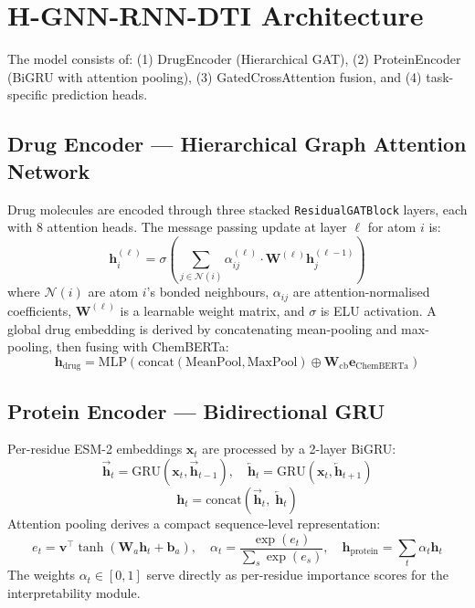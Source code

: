 \documentclass[12pt,a4paper,oneside]{report}
\begin{document}
\section{H-GNN-RNN-DTI Architecture}

The model consists of: (1) DrugEncoder (Hierarchical GAT), (2) ProteinEncoder (BiGRU with attention pooling), (3) GatedCrossAttention fusion, and (4) task-specific prediction heads.

\subsection{Drug Encoder — Hierarchical Graph Attention Network}

Drug molecules are encoded through three stacked \texttt{ResidualGATBlock} layers, each with 8 attention heads. The message passing update at layer $\ell$ for atom $i$ is:
\begin{equation}
\mathbf{h}_i^{(\ell)} = \sigma\!\left( \sum_{j \in \mathcal{N}(i)} \alpha_{ij}^{(\ell)} \cdot \mathbf{W}^{(\ell)} \mathbf{h}_j^{(\ell-1)} \right)
\label{eq:gat}
\end{equation}
where $\mathcal{N}(i)$ are atom $i$'s bonded neighbours, $\alpha_{ij}$ are attention-normalised coefficients, $\mathbf{W}^{(\ell)}$ is a learnable weight matrix, and $\sigma$ is ELU activation. A global drug embedding is derived by concatenating mean-pooling and max-pooling, then fusing with ChemBERTa:
\begin{equation}
\mathbf{h}_{\text{drug}} = \mathrm{MLP}\!\left( \mathrm{concat}(\mathrm{MeanPool}, \mathrm{MaxPool}) \oplus \mathbf{W}_{\mathrm{cb}} \mathbf{e}_{\mathrm{ChemBERTa}} \right)
\label{eq:drug-readout}
\end{equation}

\subsection{Protein Encoder — Bidirectional GRU}

Per-residue ESM-2 embeddings $\mathbf{x}_t$ are processed by a 2-layer BiGRU:
\begin{equation}
\overrightarrow{\mathbf{h}}_t = \mathrm{GRU}(\mathbf{x}_t, \overrightarrow{\mathbf{h}}_{t-1}),
\quad
\overleftarrow{\mathbf{h}}_t = \mathrm{GRU}(\mathbf{x}_t, \overleftarrow{\mathbf{h}}_{t+1})
\label{eq:bigru}
\end{equation}
\begin{equation}
\mathbf{h}_t = \mathrm{concat}(\overrightarrow{\mathbf{h}}_t,\; \overleftarrow{\mathbf{h}}_t)
\end{equation}
Attention pooling derives a compact sequence-level representation:
\begin{equation}
e_t = \mathbf{v}^\top \tanh(\mathbf{W}_a \mathbf{h}_t + \mathbf{b}_a),
\quad
\alpha_t = \frac{\exp(e_t)}{\sum_s \exp(e_s)},
\quad
\mathbf{h}_{\text{protein}} = \sum_t \alpha_t \mathbf{h}_t
\label{eq:attnpool}
\end{equation}
The weights $\alpha_t \in [0,1]$ serve directly as per-residue importance scores for the interpretability module.
\end{document}
